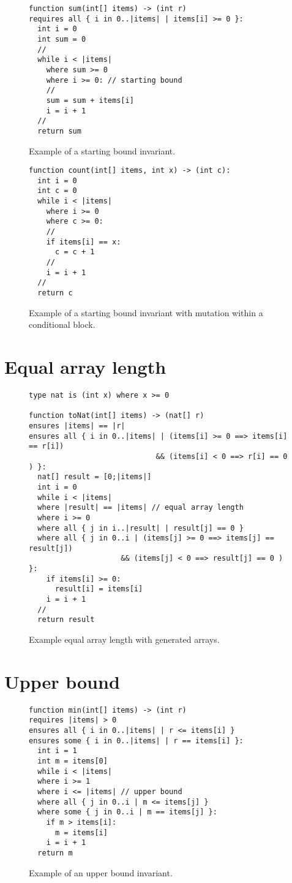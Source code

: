 \begin{appendices}
\begin{figure}[ht]
\begin{lstlisting}
function sum(int[] items) -> (int r)
requires all { i in 0..|items| | items[i] >= 0 }:
  int i = 0
  int sum = 0
  //
  while i < |items|
    where sum >= 0
    where i >= 0: // starting bound
    //
    sum = sum + items[i]
    i = i + 1
  //
  return sum
\end{lstlisting}
\caption{Example of a starting bound invariant.}
\end{figure}

\begin{figure}[ht]
\begin{lstlisting}
function count(int[] items, int x) -> (int c):
  int i = 0
  int c = 0
  while i < |items|
    where i >= 0
    where c >= 0:
    //
    if items[i] == x:
      c = c + 1
    //
    i = i + 1
  //
  return c
\end{lstlisting}
\caption{Example of a starting bound invariant with mutation within a conditional block.}
\end{figure}

\section{Equal array length}

\begin{figure}[ht]
\begin{lstlisting}
type nat is (int x) where x >= 0

function toNat(int[] items) -> (nat[] r)
ensures |items| == |r|
ensures all { i in 0..|items| | (items[i] >= 0 ==> items[i] == r[i])
                             && (items[i] < 0 ==> r[i] == 0 ) }:
  nat[] result = [0;|items|]
  int i = 0
  while i < |items|
  where |result| == |items| // equal array length
  where i >= 0
  where all { j in i..|result| | result[j] == 0 }
  where all { j in 0..i | (items[j] >= 0 ==> items[j] == result[j]) 
                     && (items[j] < 0 ==> result[j] == 0 ) }:
    if items[i] >= 0:
      result[i] = items[i]
    i = i + 1
  //
  return result
\end{lstlisting}
\caption{Example equal array length with generated arrays.}
\end{figure}

\section{Upper bound}

\begin{figure}[ht]
\begin{lstlisting}
function min(int[] items) -> (int r)
requires |items| > 0
ensures all { i in 0..|items| | r <= items[i] }
ensures some { i in 0..|items| | r == items[i] }:
  int i = 1
  int m = items[0]
  while i < |items|
  where i >= 1
  where i <= |items| // upper bound
  where all { j in 0..i | m <= items[j] }
  where some { j in 0..i | m == items[j] }:
    if m > items[i]:
      m = items[i]
    i = i + 1
  return m
\end{lstlisting}
\caption{Example of an upper bound invariant.}
\label{lst:upper-bound-min}
\end{figure}


\end{appendices}
